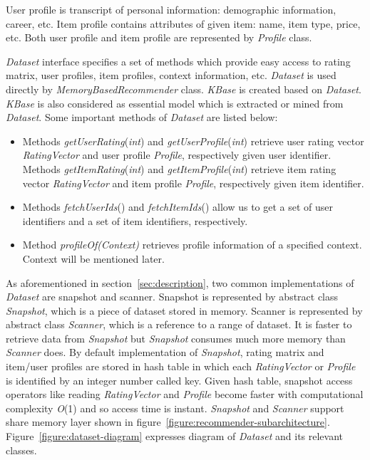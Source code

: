 \documentclass[a4paper,twoside]{article}
\begin{document}
User profile is transcript of personal information: demographic information, career, etc. Item profile contains attributes of given item: name, item type, price, etc. Both user profile and item profile are represented by \textit{Profile} class.

\textit{Dataset} interface specifies a set of methods which provide easy access to rating matrix, user profiles, item profiles, context information, etc. \textit{Dataset} is used directly by \textit{MemoryBasedRecommender} class. \textit{KBase} is created based on \textit{Dataset}. \textit{KBase} is also considered as essential model which is extracted or mined from \textit{Dataset}. Some important methods of \textit{Dataset} are listed below:
\begin{itemize}
\item Methods \textit{getUserRating}(\textit{int}) and \textit{getUserProfile}(\textit{int}) retrieve user rating vector \textit{RatingVector} and user profile \textit{Profile}, respectively given user identifier. Methods \textit{getItemRating}(\textit{int}) and \textit{getItemProfile}(\textit{int}) retrieve item rating vector \textit{RatingVector} and item profile \textit{Profile}, respectively given item identifier.
\item Methods \textit{fetchUserIds}() and \textit{fetchItemIds}() allow us to get a set of user identifiers and a set of item identifiers, respectively.
\item Method \textit{profileOf(Context)} retrieves profile information of a specified context. Context will be mentioned later.
\end{itemize}
As aforementioned in section~\ref{sec:description}, two common implementations of \textit{Dataset} are snapshot and scanner. Snapshot is represented by abstract class \textit{Snapshot}, which is a piece of dataset stored in memory. Scanner is represented by abstract class \textit{Scanner}, which is a reference to a range of dataset. It is faster to retrieve data from \textit{Snapshot} but \textit{Snapshot} consumes much more memory than \textit{Scanner} does. By default implementation of \textit{Snapshot}, rating matrix and item/user profiles are stored in hash table in which each \textit{RatingVector} or \textit{Profile} is identified by an integer number called key. Given hash table, snapshot access operators like reading \textit{RatingVector} and \textit{Profile} become faster with computational complexity \textit{O}(1) and so access time is instant. \textit{Snapshot} and \textit{Scanner} support share memory layer shown in figure~\ref{figure:recommender-subarchitecture}. Figure~\ref{figure:dataset-diagram} expresses diagram of \textit{Dataset} and its relevant classes.
\end{document}
